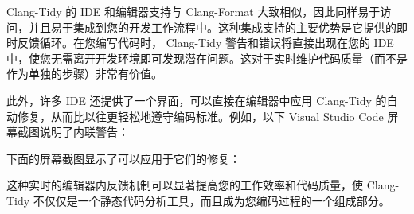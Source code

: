 Clang-Tidy 的 IDE 和编辑器支持与 Clang-Format 大致相似，因此同样易于访问，并且易于集成到您的开发工作流程中。这种集成支持的主要优势是它提供的即时反馈循环。在您编写代码时， Clang-Tidy 警告和错误将直接出现在您的 IDE 中，使您无需离开开发环境即可发现潜在问题。这对于实时维护代码质量（而不是作为单独的步骤）非常有价值。

此外，许多 IDE 还提供了一个界面，可以直接在编辑器中应用 Clang-Tidy 的自动修复，从而比以往更轻松地遵守编码标准。例如，以下 Visual Studio Code 屏幕截图说明了内联警告：


下面的屏幕截图显示了可以应用于它们的修复：


这种实时的编辑器内反馈机制可以显著提高您的工作效率和代码质量，使 Clang-Tidy 不仅仅是一个静态代码分析工具，而且成为您编码过程的一个组成部分。









